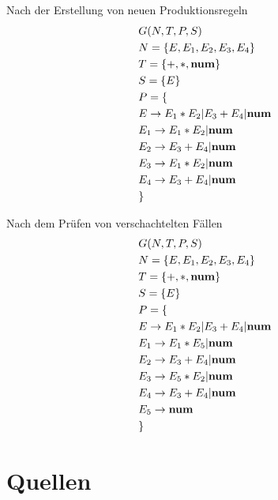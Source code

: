 \documentclass[t]{beamer}
\begin{document}
	\begin{frame}
		\centering
		\begin{minipage}[c]{0.4\textwidth}
			\vspace{-2em}
			\begin{block}{Nach der Erstellung von neuen Produktionsregeln}
				\vspace{-2em}
				\begin{align*}
					& G(N,T,P,S) \\
					& N= \{E, E_1, E_2, E_3, E_4\} \\
					& T= \{+, *, \bold{num}\} \\
					& S= \{E\} \\
					& P = \{ \\
					& E     \rightarrow E_1 * E_2 | E_3 + E_4 | \bold{num} \\
					& E_1   \rightarrow E_1 * E_2 | \bold{num} \\
					& E_2   \rightarrow E_3 + E_4 | \bold{num} \\
					& E_3   \rightarrow E_1 * E_2 | \bold{num} \\
					& E_4   \rightarrow E_3 + E_4 | \bold{num} \\
					& \}
				\end{align*}
			\end{block}
		\end{minipage}%
		\quad%
		\quad%
		\begin{minipage}[c]{0.4\textwidth}
			\vspace{-1em}
			\begin{block}{Nach dem Prüfen von verschachtelten Fällen}
				\vspace{-2em}
				\begin{align*}
					& G(N,T,P,S) \\
					& N= \{E, E_1, E_2, E_3, E_4\} \\
					& T= \{+, *, \bold{num}\} \\
					& S= \{E\} \\
					& P = \{ \\
					& E     \rightarrow E_1 * E_2 | E_3 + E_4 | \bold{num} \\
					& E_1   \rightarrow E_1 * E_5 | \bold{num} \\
					& E_2   \rightarrow E_3 + E_4 | \bold{num} \\
					& E_3   \rightarrow E_5 * E_2 | \bold{num} \\
					& E_4   \rightarrow E_3 + E_4 | \bold{num} \\
					& E_5   \rightarrow \bold{num} \\
					& \}
				\end{align*}
			\end{block}
		\end{minipage}
	\end{frame}


	\section{Quellen}\label{sec:quellen}
	\begin{frame}[allowframebreaks]
		
		
	\end{frame}
\end{document}
